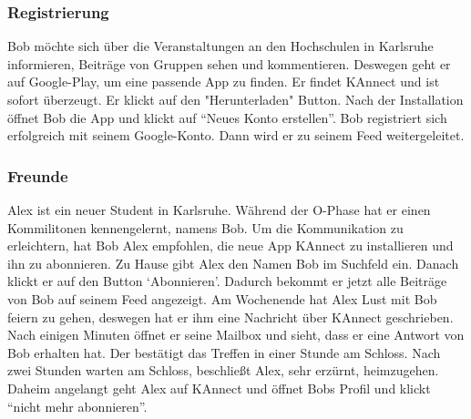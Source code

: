 \documentclass[parskip=full]{scrartcl}
\begin{document}
	\subsubsection{Registrierung}
	Bob möchte sich über die Veranstaltungen an den Hochschulen in Karlsruhe informieren, Beiträge von Gruppen sehen und kommentieren. Deswegen geht er auf Google-Play, um eine passende \gls{App} zu finden. Er findet KAnnect und ist sofort überzeugt. Er klickt auf den "Herunterladen" \gls{Button}. Nach der Installation öffnet Bob die \gls{App} und klickt auf “Neues Konto erstellen”. Bob registriert sich erfolgreich mit seinem Google-Konto. Dann wird er zu seinem \gls{Feed} weitergeleitet.
	
	\subsubsection{Freunde}
	Alex ist ein neuer Student in Karlsruhe.  Während der O-Phase hat er einen Kommilitonen kennengelernt, namens Bob. Um die Kommunikation zu erleichtern, hat Bob Alex empfohlen, die neue \gls{App}  KAnnect zu installieren und ihn zu abonnieren. Zu Hause gibt Alex den Namen Bob im Suchfeld ein. Danach klickt er auf den \gls{Button} ‘Abonnieren’. Dadurch bekommt er jetzt alle Beiträge von Bob auf seinem \gls{Feed} angezeigt. Am Wochenende hat Alex Lust mit Bob feiern zu gehen, deswegen hat er ihm eine Nachricht über KAnnect geschrieben. Nach einigen Minuten öffnet er seine Mailbox und sieht, dass er eine Antwort von Bob erhalten hat. Der bestätigt das Treffen in einer Stunde am Schloss. Nach zwei Stunden warten am Schloss, beschließt Alex, sehr erzürnt, heimzugehen. Daheim angelangt geht Alex auf KAnnect und öffnet Bobs Profil und klickt “nicht mehr abonnieren”.
	
\end{document}
